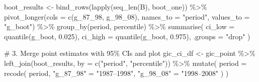 \documentclass[
  letterpaper,
  DIV=11,
  numbers=noendperiod]{scrartcl}
\newenvironment{Shaded}{\begin{snugshade}}{\end{snugshade}}
\newcommand{\AttributeTok}[1]{\textcolor[rgb]{0.40,0.45,0.13}{#1}}
\newcommand{\CommentTok}[1]{\textcolor[rgb]{0.37,0.37,0.37}{#1}}
\newcommand{\FloatTok}[1]{\textcolor[rgb]{0.68,0.00,0.00}{#1}}
\newcommand{\FunctionTok}[1]{\textcolor[rgb]{0.28,0.35,0.67}{#1}}
\newcommand{\NormalTok}[1]{\textcolor[rgb]{0.00,0.23,0.31}{#1}}
\newcommand{\OtherTok}[1]{\textcolor[rgb]{0.00,0.23,0.31}{#1}}
\newcommand{\SpecialCharTok}[1]{\textcolor[rgb]{0.37,0.37,0.37}{#1}}
\newcommand{\StringTok}[1]{\textcolor[rgb]{0.13,0.47,0.30}{#1}}
\begin{document}
\begin{Shaded}
\begin{Highlighting}[]
\NormalTok{boot\_results }\OtherTok{\textless{}{-}} \FunctionTok{bind\_rows}\NormalTok{(}\FunctionTok{lapply}\NormalTok{(}\FunctionTok{seq\_len}\NormalTok{(B), boot\_one)) }\SpecialCharTok{\%\textgreater{}\%}
  \FunctionTok{pivot\_longer}\NormalTok{(}\AttributeTok{cols =} \FunctionTok{c}\NormalTok{(g\_87\_98, g\_98\_08), }\AttributeTok{names\_to =} \StringTok{"period"}\NormalTok{, }\AttributeTok{values\_to =} \StringTok{"g\_boot"}\NormalTok{) }\SpecialCharTok{\%\textgreater{}\%}
  \FunctionTok{group\_by}\NormalTok{(period, percentile) }\SpecialCharTok{\%\textgreater{}\%}
  \FunctionTok{summarise}\NormalTok{(}
    \AttributeTok{ci\_low  =} \FunctionTok{quantile}\NormalTok{(g\_boot, }\FloatTok{0.025}\NormalTok{),}
    \AttributeTok{ci\_high =} \FunctionTok{quantile}\NormalTok{(g\_boot, }\FloatTok{0.975}\NormalTok{),}
    \AttributeTok{.groups =} \StringTok{"drop"}
\NormalTok{  )}

\CommentTok{\# 3. Merge point estimates with 95\% CIs and plot}
\NormalTok{gic\_ci\_df }\OtherTok{\textless{}{-}}\NormalTok{ gic\_point }\SpecialCharTok{\%\textgreater{}\%}
  \FunctionTok{left\_join}\NormalTok{(boot\_results, }\AttributeTok{by =} \FunctionTok{c}\NormalTok{(}\StringTok{"period"}\NormalTok{, }\StringTok{"percentile"}\NormalTok{)) }\SpecialCharTok{\%\textgreater{}\%}
  \FunctionTok{mutate}\NormalTok{(}
    \AttributeTok{period =} \FunctionTok{recode}\NormalTok{(}
\NormalTok{      period,}
      \StringTok{"g\_87\_98"} \OtherTok{=} \StringTok{"1987–1998"}\NormalTok{,}
      \StringTok{"g\_98\_08"} \OtherTok{=} \StringTok{"1998–2008"}
\NormalTok{    )}
\NormalTok{  )}


\end{Highlighting}
\end{Shaded}
\end{document}
